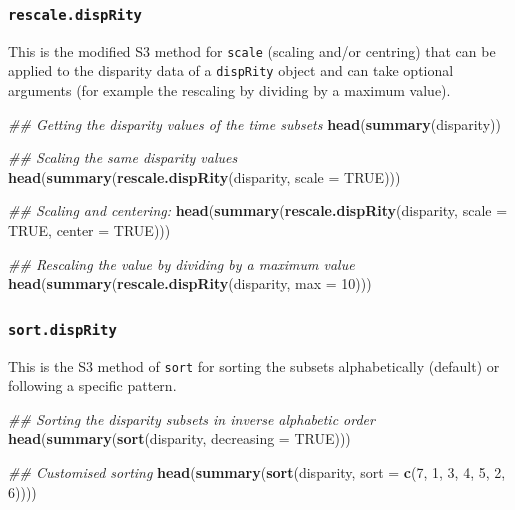 \documentclass[
]{book}
\newenvironment{Shaded}{\begin{snugshade}}{\end{snugshade}}
\newcommand{\CommentTok}[1]{\textcolor[rgb]{0.56,0.35,0.01}{\textit{#1}}}
\newcommand{\DataTypeTok}[1]{\textcolor[rgb]{0.13,0.29,0.53}{#1}}
\newcommand{\DecValTok}[1]{\textcolor[rgb]{0.00,0.00,0.81}{#1}}
\newcommand{\KeywordTok}[1]{\textcolor[rgb]{0.13,0.29,0.53}{\textbf{#1}}}
\newcommand{\NormalTok}[1]{#1}
\newcommand{\OtherTok}[1]{\textcolor[rgb]{0.56,0.35,0.01}{#1}}
\begin{document}
\hypertarget{rescale.disprity}{%
\subsubsection{\texorpdfstring{\texttt{rescale.dispRity}}{rescale.dispRity}}\label{rescale.disprity}}

This is the modified S3 method for \texttt{scale} (scaling and/or centring) that can be applied to the disparity data of a \texttt{dispRity} object and can take optional arguments (for example the rescaling by dividing by a maximum value).

\begin{Shaded}
\begin{Highlighting}[]
\CommentTok{\#\# Getting the disparity values of the time subsets}
\KeywordTok{head}\NormalTok{(}\KeywordTok{summary}\NormalTok{(disparity))}

\CommentTok{\#\# Scaling the same disparity values}
\KeywordTok{head}\NormalTok{(}\KeywordTok{summary}\NormalTok{(}\KeywordTok{rescale.dispRity}\NormalTok{(disparity, }\DataTypeTok{scale =} \OtherTok{TRUE}\NormalTok{)))}

\CommentTok{\#\# Scaling and centering:}
\KeywordTok{head}\NormalTok{(}\KeywordTok{summary}\NormalTok{(}\KeywordTok{rescale.dispRity}\NormalTok{(disparity, }\DataTypeTok{scale =} \OtherTok{TRUE}\NormalTok{, }\DataTypeTok{center =} \OtherTok{TRUE}\NormalTok{)))}

\CommentTok{\#\# Rescaling the value by dividing by a maximum value}
\KeywordTok{head}\NormalTok{(}\KeywordTok{summary}\NormalTok{(}\KeywordTok{rescale.dispRity}\NormalTok{(disparity, }\DataTypeTok{max =} \DecValTok{10}\NormalTok{)))}
\end{Highlighting}
\end{Shaded}

\hypertarget{sort.disprity}{%
\subsubsection{\texorpdfstring{\texttt{sort.dispRity}}{sort.dispRity}}\label{sort.disprity}}

This is the S3 method of \texttt{sort} for sorting the subsets alphabetically (default) or following a specific pattern.

\begin{Shaded}
\begin{Highlighting}[]
\CommentTok{\#\# Sorting the disparity subsets in inverse alphabetic order}
\KeywordTok{head}\NormalTok{(}\KeywordTok{summary}\NormalTok{(}\KeywordTok{sort}\NormalTok{(disparity, }\DataTypeTok{decreasing =} \OtherTok{TRUE}\NormalTok{)))}

\CommentTok{\#\# Customised sorting}
\KeywordTok{head}\NormalTok{(}\KeywordTok{summary}\NormalTok{(}\KeywordTok{sort}\NormalTok{(disparity, }\DataTypeTok{sort =} \KeywordTok{c}\NormalTok{(}\DecValTok{7}\NormalTok{, }\DecValTok{1}\NormalTok{, }\DecValTok{3}\NormalTok{, }\DecValTok{4}\NormalTok{, }\DecValTok{5}\NormalTok{, }\DecValTok{2}\NormalTok{, }\DecValTok{6}\NormalTok{))))}
\end{Highlighting}
\end{Shaded}
\end{document}
